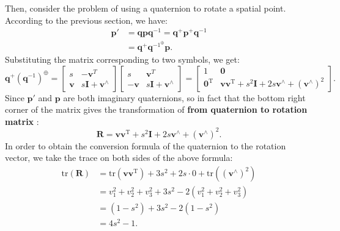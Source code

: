 Then, consider the problem of using a quaternion to rotate a spatial point. According to the previous section, we have:
\begin{equation}
	\begin{split}
		\mathbf{p}' &= \mathbf{q} \mathbf{p} \mathbf{q}^{-1} = \mathbf{q}^+ \mathbf{p}^+ \mathbf{q}^{ -1} \\
		&= \mathbf{q}^+ \mathbf{q}^{{-1}^{\oplus}} \mathbf{p}.
	\end{split}
\end{equation}
Substituting the matrix corresponding to two symbols, we get:
\begin{equation}\label{eq:quaternion-to-rotation-matrix-derive}
	{\mathbf{q}^ + }{\left( {{\mathbf{q}^{ - 1}}} \right)^ \oplus } = \left[ \begin{array}{*{20}{c }}
		s&-\mathbf{v}^T\\
		\mathbf{v}&s\mathbf{I}+\mathbf{v}^\wedge
	\end{array} \right]\left[\begin{array}{*{20}{c}}
		s&{\mathbf{v} ^T}\\
		{ - \mathbf{v} }&{s\mathbf{I} + \mathbf{v} ^ \wedge }
	\end{array} \right] = \left[ \begin{array}{*{20}{c}}
		1&\mathbf{0} \\
		\mathbf{0}^\mathrm{T}&\mathbf{v}\mathbf{v}^\mathrm{T} + {s^2} \mathbf{I} + 2s\mathbf{v} ^ \wedge + {(\mathbf{v} ^ \wedge)}^2
	\end{array} \right].
\end{equation}
Since $\mathbf{p}'$ and $\mathbf{p}$ are both imaginary quaternions, so in fact that the bottom right corner of the matrix gives the transformation of \textbf{from quaternion to rotation matrix} :
\begin{equation}
	\mathbf{R} = \mathbf{v} \mathbf{v}^\mathrm{T} + {s^2} \mathbf{I} + 2s\mathbf{v} ^ \wedge + {(\mathbf{v } ^ \wedge)}^2.
\end{equation}
In order to obtain the conversion formula of the quaternion to the rotation vector, we take the trace on both sides of the above formula:
\begin{equation}
	\begin{aligned}
		\mathrm{tr}(\mathbf{R}) &= \mathrm{tr}(\mathbf{v}\mathbf{v}^\mathrm{T}) + 3s^2 + 2s \cdot 0 + \mathrm{tr }((\mathbf{v}^\wedge)^2) \\
		&= v_1^2+v_2^2+v_3^2 + 3s^2 - 2(v_1^2+v_2^2+v_3^2) \\
		&= (1-s^2) + 3s^2 -2(1-s^2)\\
		&= 4s^2 -1.
	\end{aligned}
\end{equation}
